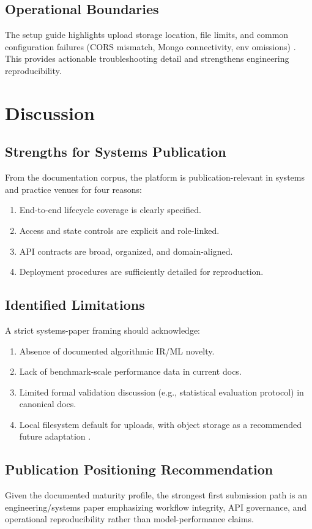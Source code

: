 \documentclass[conference]{IEEEtran}
\begin{document}
\subsection{Operational Boundaries}
The setup guide highlights upload storage location, file limits, and common configuration failures (CORS mismatch, Mongo connectivity, env omissions) \cite{setup}. This provides actionable troubleshooting detail and strengthens engineering reproducibility.

\section{Discussion}
\subsection{Strengths for Systems Publication}
From the documentation corpus, the platform is publication-relevant in systems and practice venues for four reasons:
\begin{enumerate}
\item End-to-end lifecycle coverage is clearly specified.
\item Access and state controls are explicit and role-linked.
\item API contracts are broad, organized, and domain-aligned.
\item Deployment procedures are sufficiently detailed for reproduction.
\end{enumerate}

\subsection{Identified Limitations}
A strict systems-paper framing should acknowledge:
\begin{enumerate}
\item Absence of documented algorithmic IR/ML novelty.
\item Lack of benchmark-scale performance data in current docs.
\item Limited formal validation discussion (e.g., statistical evaluation protocol) in canonical docs.
\item Local filesystem default for uploads, with object storage as a recommended future adaptation \cite{setup}.
\end{enumerate}

\subsection{Publication Positioning Recommendation}
Given the documented maturity profile, the strongest first submission path is an engineering/systems paper emphasizing workflow integrity, API governance, and operational reproducibility rather than model-performance claims.
\end{document}
